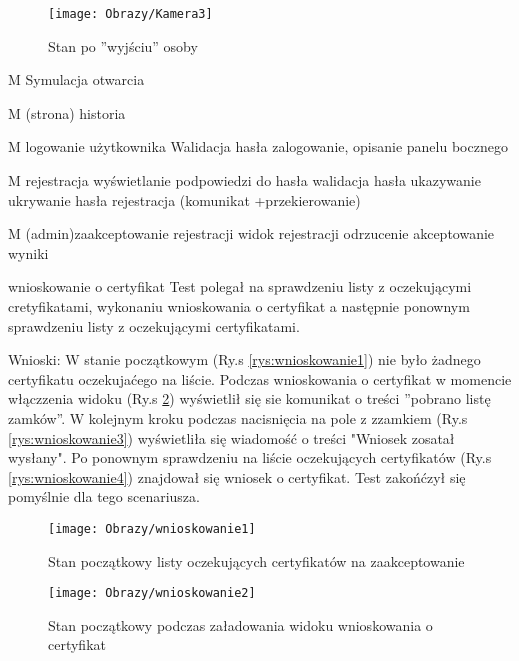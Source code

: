 \begin{enumerate*}
	\begin{figure}[ht!]
		\vspace{-1.7cm}
		\centering
		\texttt{[image: Obrazy/Kamera3]}
		\caption{Stan po ''wyjściu'' osoby}
		\label{rys:Kamera3}
	\end{figure}
\newpage
	\item M Symulacja otwarcia
	\item M (strona) historia
	\item M logowanie użytkownika
	Walidacja hasła 
	zalogowanie, 
	opisanie panelu bocznego
	\item M rejestracja
	wyświetlanie podpowiedzi do hasła
	walidacja hasła 
	ukazywanie ukrywanie hasła
	rejestracja (komunikat +przekierowanie)
	\item M (admin)zaakceptowanie rejestracji
	widok rejestracji odrzucenie 
	akceptowanie wyniki
	\item  wnioskowanie o certyfikat\newline
	Test polegał na sprawdzeniu listy z oczekującymi cretyfikatami, wykonaniu wnioskowania o certyfikat a następnie ponownym sprawdzeniu listy z oczekującymi certyfikatami.
	
	Wnioski: W stanie początkowym (Ry.s \ref{rys:wnioskowanie1}) nie było żadnego certyfikatu oczekujaćego na liście. Podczas wnioskowania o certyfikat w momencie włączzenia widoku (Ry.s \ref{rys:wnioskowanie2}) wyświetlił się  sie komunikat o treści ''pobrano listę zamków''. W kolejnym kroku podczas nacisnięcia na pole z zzamkiem (Ry.s \ref{rys:wnioskowanie3}) wyświetliła się wiadomość o treści "Wniosek zosatał wysłany". Po ponownym sprawdzeniu na liście oczekujących certyfikatów (Ry.s \ref{rys:wnioskowanie4}) znajdował się wniosek o certyfikat. Test zakońćzył się pomyślnie dla tego scenariusza.
	
	
	\begin{figure}[ht!]

		\begin{minipage}{0.2\textwidth}
			\texttt{[image: Obrazy/wnioskowanie1]}
			\caption{Stan początkowy listy oczekujących certyfikatów na zaakceptowanie }
			\label{rys:wnioskowanie1}
		\end{minipage}
		\begin{minipage}{0.2\textwidth}
			\texttt{[image: Obrazy/wnioskowanie2]}
			\caption{Stan początkowy podczas załadowania widoku wnioskowania o certyfikat}
			\label{rys:wnioskowanie2}
		\end{minipage}
	

\end{figure}
\end{enumerate*}
